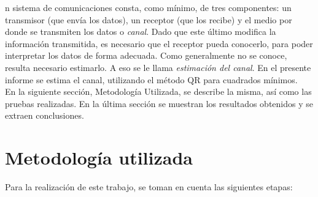 \documentclass[10pt,journal,compsoc]{IEEEtran}
\begin{document}
%
%
%
%
n sistema de comunicaciones consta, como m\'inimo, de tres componentes: un transmisor (que env\'ia los datos), un receptor (que los recibe) y el medio por donde se transmiten los datos o \textit{canal}. Dado que este \'ultimo modifica la informaci\'on transmitida, es necesario que el receptor pueda conocerlo, para poder interpretar los datos de forma adecuada. Como generalmente no se conoce, resulta necesario estimarlo. A eso se le llama \textit{estimaci\'on del canal}. En el presente informe se estima el canal, utilizando el m\'etodo QR para cuadrados m\'inimos.\\
En la siguiente secci\'on, Metodolog\'ia Utilizada, se describe la misma, as\'i como las pruebas realizadas.
En la \'ultima secci\'on se muestran los resultados obtenidos y se extraen conclusiones. \\

\section{Metodolog\'ia utilizada}
Para la realizaci\'on de este trabajo, se toman en cuenta las siguientes etapas:
\end{document}
